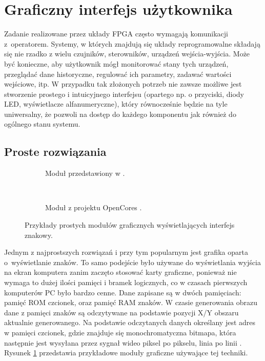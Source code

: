 
\rozdzial

\section{Graficzny interfejs użytkownika}


Zadanie realizowane przez układy FPGA często wymagają komunikacji z~operatorem. Systemy, w których znajdują się układy reprogramowalne składają się nie rzadko z wielu czujników, sterowników, urządzeń wejścia-wyjścia. Może być konieczne, aby użytkownik mógł monitorować stany tych urządzeń, przeglądać dane historyczne, regulować ich parametry, zadawać wartości wejściowe, itp.
W przypadku tak złożonych potrzeb nie zawsze możliwe jest stworzenie prostego i intuicyjnego interfejsu (opartego np. o przyciski, diody LED, wyświetlacze alfanumeryczne), który równocześnie będzie na tyle uniwersalny, że pozwoli na dostęp do każdego komponentu jak również do ogólnego stanu systemu. \cite{xilinxHmi}

\subsection{Proste rozwiązania}
\label{Proste_rozwiązania}

\begin{figure}[htb]
	\centering
	\begin{subfigure}[b]{7.5cm}
		\caption{ Moduł przedstawiony w \cite{RapidFPGA}. }
	\end{subfigure}
	~
	\begin{subfigure}[b]{7cm}
		\caption{ Moduł z projektu OpenCores \cite{VGAOpenCores}. }
	\end{subfigure}
	\caption{ Przykłady prostych modułów graficznych wyświetlających interfejs znakowy. }
	\label{VGATermExample}
\end{figure}


Jednym z najprostszych rozwiązań i przy tym popularnym jest grafika oparta o~wyświetlanie znaków. To samo podejście było używane do wyświetlania wyjścia na ekran komputera zanim zaczęto stosować karty graficzne, ponieważ nie wymaga to dużej ilości pamięci i bramek logicznych, co w czasach pierwszych komputerów PC było bardzo cenne. Dane zapisane są w dwóch pamięciach: pamięć ROM czcionek, oraz pamięć RAM znaków. W czasie generowania obrazu dane z pamięci znaków są odczytywane na podstawie pozycji X/Y obszaru aktualnie generowanego. Na podstawie odczytanych danych określany jest adres w pamięci czcionek, gdzie znajduje się monochromatyczna bitmapa, która następnie jest wysyłana przez sygnał wideo piksel po pikselu, linia po linii \cite{RapidFPGA}. Rysunek \ref{VGATermExample} przedstawia przykładowe moduły graficzne używające tej techniki.



